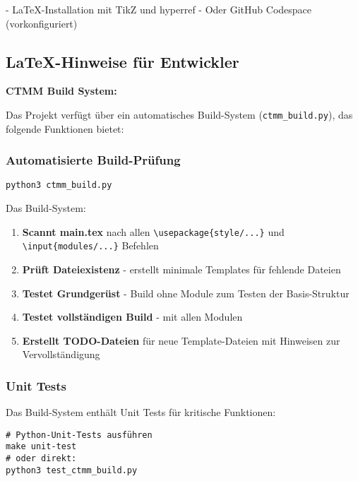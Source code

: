 - LaTeX-Installation mit TikZ und hyperref
- Oder GitHub Codespace (vorkonfiguriert)

\hypertarget{latex-hinweise-fuer-entwickler}{%
\subsection{LaTeX-Hinweise für Entwickler}\label{latex-hinweise-fuer-entwickler}}

\textbf{CTMM Build System:}

Das Projekt verfügt über ein automatisches Build-System (\texttt{ctmm\_build.py}), das folgende Funktionen bietet:

\hypertarget{automatisierte-build-pruefung}{%
\subsubsection{Automatisierte Build-Prüfung}\label{automatisierte-build-pruefung}}

\begin{verbatim}
python3 ctmm_build.py
\end{verbatim}

Das Build-System:
\begin{enumerate}
\def\labelenumi{\arabic{enumi}.}
\tightlist
\item
  \textbf{Scannt main.tex} nach allen \texttt{\textbackslash{}usepackage\{style/...\}} und \texttt{\textbackslash{}input\{modules/...\}} Befehlen
\item
  \textbf{Prüft Dateiexistenz} - erstellt minimale Templates für fehlende Dateien
\item
  \textbf{Testet Grundgerüst} - Build ohne Module zum Testen der Basis-Struktur
\item
  \textbf{Testet vollständigen Build} - mit allen Modulen
\item
  \textbf{Erstellt TODO-Dateien} für neue Template-Dateien mit Hinweisen zur Vervollständigung
\end{enumerate}

\hypertarget{unit-tests}{%
\subsubsection{Unit Tests}\label{unit-tests}}

Das Build-System enthält Unit Tests für kritische Funktionen:

\begin{verbatim}
# Python-Unit-Tests ausführen
make unit-test
# oder direkt:
python3 test_ctmm_build.py
\end{verbatim}

